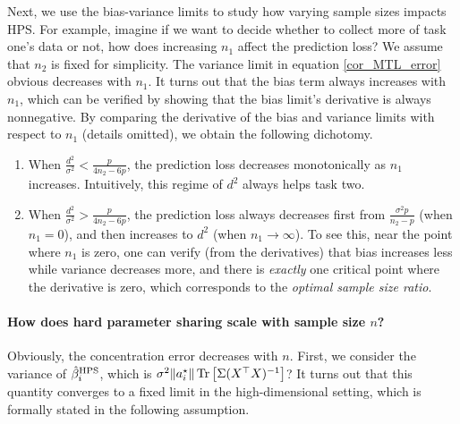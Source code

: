 \begin{example}
Next, we use the bias-variance limits to study how varying sample sizes impacts HPS.
For example, imagine if we want to decide whether to collect more of task one's data or not, how does increasing $n_1$ affect the prediction loss?
We assume that $n_2$ is fixed for simplicity.
The variance limit in equation \eqref{cor_MTL_error} obvious decreases with $n_1$.
It turns out that the bias term always increases with $n_1$, which can be verified by showing that the bias limit's derivative is always nonnegative.
By comparing the derivative of the bias and variance limits with respect to $n_1$ (details omitted), we obtain the following dichotomy.
\begin{enumerate}
	\item When $\frac{d^2}{\sigma^2} < \frac{p}{4n_2 - 6p}$, the prediction loss decreases monotonically as $n_1$ increases.
	Intuitively, this regime of $d^2$ always helps task two.
	\item When $\frac{d^2}{\sigma^2} > \frac{p}{4n_2 - 6p}$, the prediction loss always decreases first from $\frac{\sigma^2 p}{n_2 - p}$ (when $n_1 = 0$), and then increases to $d^2$ (when $n_1 \rightarrow \infty$).
	To see this, near the point where $n_1$ is zero, one can verify (from the derivatives) that bias increases less while variance decreases more, and there is \textit{exactly} one critical point where the derivative is zero, which corresponds to the \textit{optimal sample size ratio}.
\end{enumerate}
\fi
	\end{example}


\paragraph{How does hard parameter sharing scale with sample size $n$?}
Obviously, the concentration error decreases with $n$.
First, we consider the variance of $\hat{\beta}_i^{\textup{HPS}}$, which is $\sigma^2\|a_i^{\star}\| \operatorname{Tr}\left[\Sigma (X^{\top} X)^{-1}\right]$?
It turns out that this quantity converges to a fixed limit in the high-dimensional setting, which is formally stated in the following assumption.

